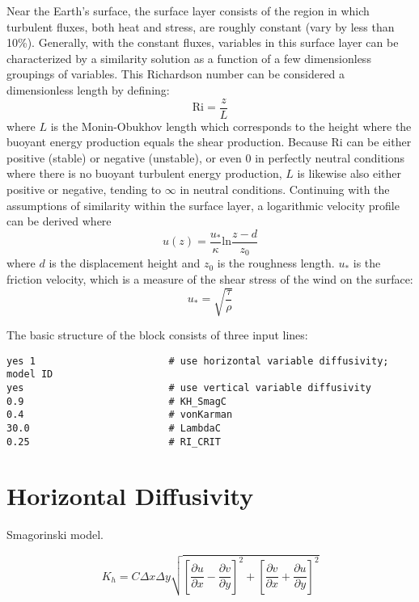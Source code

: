 Near the Earth's surface, the surface layer consists of the region in which turbulent fluxes,
both heat and stress, are roughly constant (vary by less than 10\%). Generally, with the constant
fluxes, variables in this surface layer can be characterized by a similarity solution as a function
of a few dimensionless groupings of variables. This Richardson number can be considered a dimensionless
length by defining:
\begin{equation}
\mathrm{Ri} = \frac{z}{L}
\end{equation}
where $L$ is the Monin-Obukhov length which corresponds to the height where the buoyant energy production
equals the shear production. Because $\mathrm{Ri}$ can be either positive (stable) or negative (unstable), or
even 0 in perfectly neutral conditions where there is no buoyant turbulent energy production, $L$ is likewise
also either positive or negative, tending to $\infty$ in neutral conditions. Continuing with the assumptions
of similarity within the surface layer, a logarithmic velocity profile can be derived where
\begin{equation}
u(z) = \frac{u_{*}}{\kappa} \mathrm{ln} \frac{z-d}{z_0}
\end{equation}
where $d$ is the displacement height and $z_0$ is the roughness length.
$u_{*}$ is the friction velocity, which is a measure of the shear stress of the wind on the surface:
\begin{equation}
u_{*} = \sqrt{\frac{\tau}{\rho}}
\end{equation}





The basic
structure of the block consists of three input lines:
\small
\begin{verbatim}
yes 1                       # use horizontal variable diffusivity; model ID
yes                         # use vertical variable diffusivity
0.9                         # KH_SmagC
0.4                         # vonKarman
30.0                        # LambdaC
0.25                        # RI_CRIT
\end{verbatim}
\normalsize

\section{Horizontal Diffusivity}\label{ChapAppendVarDiff_Sec_Kh}
Smagorinski model.

\begin{equation}
K_h = C \Delta x \Delta y \sqrt{\left[ \frac{\partial u}{\partial x} -\frac{\partial v}{\partial y} \right]^2
+ \left[ \frac{\partial v}{\partial x} +\frac{\partial u}{\partial y} \right]^2}
\end{equation}

